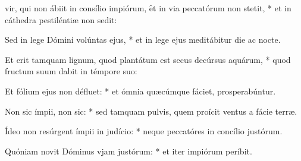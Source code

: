 \begin{psalmus}

     vir, qui non ábiit in consílio impiórum, \f et in via peccatórum non stetit, * et in cáthedra pestiléntiæ non sedit:

    Sed in lege Dómini volúntas ejus, * et in lege ejus meditábitur die ac nocte.

    Et erit tamquam lignum, quod plantátum est secus decúrsus aquárum, * quod fructum suum dabit in témpore suo:

    Et fólium ejus non défluet: * et ómnia quæcúmque fáciet, prosperabúntur.

    Non sic ímpii, non sic: * sed tamquam pulvis, quem proícit ventus a fácie terræ.

    Ídeo non resúrgent ímpii in judício: * neque peccatóres in concílio justórum.

    Quóniam novit Dóminus vjam justórum: * et iter impiórum períbit.

\end{psalmus}
